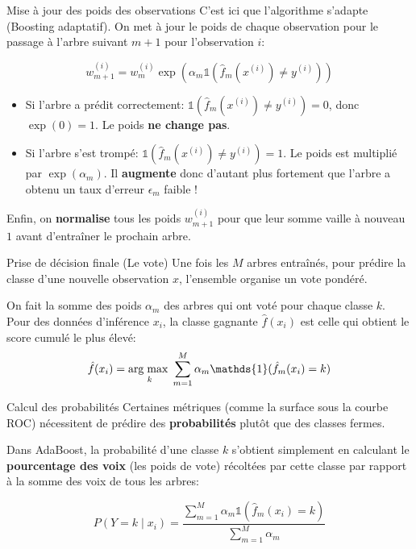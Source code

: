 \begin{frame}{Mise à jour des poids des observations}
	C'est ici que l'algorithme s'adapte (Boosting adaptatif). On met à jour le poids de chaque observation pour le passage à l'arbre suivant $m+1$ pour l'observation $i$:
	
	\begin{equation*}
		w_{m+1}^{(i)} = w_m^{(i)} \exp\left(\alpha_m \mathds{1}(\hat{f}_m(x^{(i)}) \neq y^{(i)})\right)
	\end{equation*}
	
	\pause
	\begin{itemize}
		\item Si l'arbre a prédit correctement: $\mathds{1}(\hat{f}_m(x^{(i)}) \neq y^{(i)}) = 0$, donc $\exp(0) = 1$. Le poids \textbf{ne change pas}.
		\item Si l'arbre s'est trompé: $\mathds{1}(\hat{f}_m(x^{(i)}) \neq y^{(i)}) = 1$. Le poids est multiplié par $\exp(\alpha_m)$. Il \textbf{augmente} donc d'autant plus fortement que l'arbre a obtenu un taux d'erreur $\epsilon_m$ faible !
	\end{itemize}
	
	\vspace{0.3cm}
	Enfin, on \textbf{normalise} tous les poids $w_{m+1}^{(i)}$ pour que leur somme vaille à nouveau $1$ avant d'entraîner le prochain arbre.
\end{frame}

\begin{frame}{Prise de décision finale (Le vote)}
	Une fois les $M$ arbres entraînés, pour prédire la classe d'une nouvelle observation $x$, l'ensemble organise un vote pondéré.
	
	\vspace{0.5cm}
	On fait la somme des poids $\alpha_m$ des arbres qui ont voté pour chaque classe $k$. Pour des données d'inférence $x_i$, la classe gagnante $\hat{f}(x_i)$ est celle qui obtient le score cumulé le plus élevé:	
	\begin{equation*}
		\hat{f}(x_i) = \argmax{k} \sum_{m=1}^M \alpha_m \mathds{1}(\hat{f}_m(x_i) = k)
	\end{equation*}
\end{frame}

\begin{frame}{Calcul des probabilités}
	Certaines métriques (comme la surface sous la courbe ROC) nécessitent de prédire des \textbf{probabilités} plutôt que des classes fermes.
	
	\vspace{0.5cm}
	Dans AdaBoost, la probabilité d'une classe $k$ s'obtient simplement en calculant le \textbf{pourcentage des voix} (les poids de vote) récoltées par cette classe par rapport à la somme des voix de tous les arbres:
	
	\begin{equation*}
		P(Y = k \mid x_i) = \frac{\sum_{m=1}^M \alpha_m \mathds{1}(\hat{f}_m(x_i) = k)}{\sum_{m=1}^M \alpha_m}
	\end{equation*}

\end{frame}

